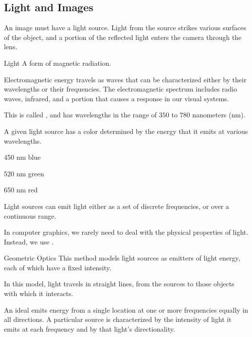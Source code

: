 \documentclass[\main/notes.tex]{subfiles}
\begin{document}
			\subsection{Light and Images}
				An image must have a light source.
				Light from the source strikes various surfaces of the object,
				and a portion of the reflected light enters the camera through the lens.

				\begin{definition}{Light}
					A form of magnetic radiation.

					Electromagnetic energy travels as waves that can be characterized either by
					their wavelengths or their frequencies.
					The electromagnetic spectrum includes radio waves, infrared, and a portion that
					causes a response in our visual systems.

					This  is called ,
					and has wavelengths in the range of $350$ to $780$ nanometers (nm).

					A given light source has a color determined by the energy that it emits at various
					wavelengths.

					\begin{indentparagraph}
						\begin{descriptimize}[nosep]
							\item[450 nm] blue
							\item[520 nm] green
							\item[650 nm] red
						\end{descriptimize}
					\end{indentparagraph}
				\end{definition}

				Light sources can emit light either as a set of discrete frequencies,
				or over a continuous range.

				In computer graphics, we rarely need to deal with the physical properties of light.
				Instead, we use \concept{geometric optics}.

				\begin{definition}{Geometric Optics}
					This method models light sources as emitters of light energy,
					each of which have a fixed intensity.

					In this model, light travels in straight lines,
					from the sources to those objects with which it interacts.
				\end{definition}

				An ideal  emits energy from a single location
				at one or more frequencies equally in all directions.
				A particular source is characterized by the
				intensity of light it emits at each frequency and
				by that light's directionality.
\end{document}

